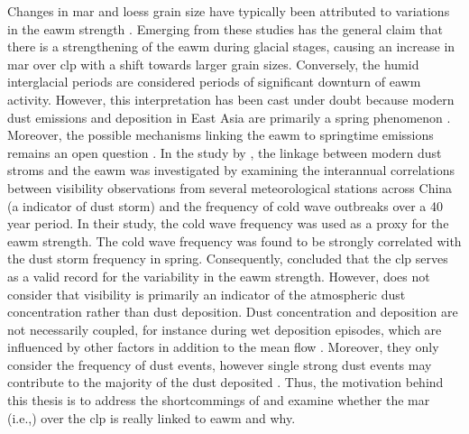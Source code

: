 Changes in \acrfull{mar} and loess grain size have typically been attributed to variations in the \acrshort{eawm} strength \parencite{stevens2007reinterpreting}.
Emerging from these studies has the general claim that there is a strengthening of the \acrshort{eawm} during glacial stages, causing an increase in \acrshort{mar} over \acrshort{clp} with a shift towards larger grain sizes.
Conversely, the humid interglacial periods are considered periods of significant downturn of \acrshort{eawm} activity.
However, this interpretation has been cast under doubt because modern dust emissions and deposition in East Asia are primarily a spring phenomenon \parencite{sun2001spatial}.
Moreover, the possible mechanisms linking the \acrshort{eawm} to springtime emissions remains an open question \parencite{roe2009interpretation}. 
In the study by \citeauthor{wyrwoll2016cold}, the linkage between modern dust stroms and the \acrshort{eawm} was investigated by examining the interannual correlations between visibility observations from several meteorological stations across China (a indicator of dust storm) and the frequency of cold wave outbreaks over a 40 year period. 
In their study, the cold wave frequency was used as a proxy for the \acrshort{eawm} strength. 
The cold wave frequency was found to be strongly correlated with the dust storm frequency in spring.
Consequently, \citeauthor{wyrwoll2016cold} concluded that the \acrshort{clp} serves as a valid record for the variability in the \acrshort{eawm} strength.
However, \citeauthor{wyrwoll2016cold} does not consider that visibility is primarily an indicator of the atmospheric dust concentration rather than dust deposition. 
Dust concentration and deposition are not necessarily coupled, for instance during wet deposition episodes, which are influenced by other factors in addition to the mean flow \parencite{osada2014wet}. 
Moreover, they only consider the frequency of dust events, however single strong dust events may contribute to the majority of the dust deposited \parencite{ta2004measurements}. 
Thus, the motivation behind this thesis is to address the shortcommings of \textcite{wyrwoll2016cold} and examine whether the \acrshort{mar} (i.e.,) over the \acrshort{clp} is really linked to \acrshort{eawm} and why.

